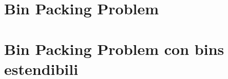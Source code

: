 \documentclass[a4paper]{report}
\begin{document}
\chapter{Bin Packing Problem}


\chapter{Bin Packing Problem con bins estendibili}

\end{document}
